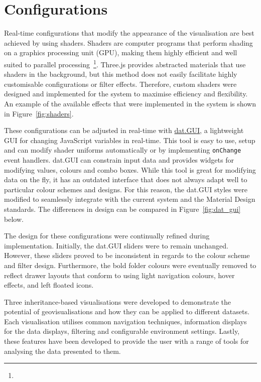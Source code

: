 \section{Configurations} {
\label{sec:configurations}

	Real-time configurations that modify the appearance of the visualisation are best achieved by using shaders. Shaders are computer programs that perform shading on a graphics processing unit (GPU), making them highly efficient and well suited to parallel processing~\footnote{}. Three.js provides abstracted materials that use shaders in the background, but this method does not easily facilitate highly customisable configurations or filter effects. Therefore, custom shaders were designed and implemented for the system to maximise efficiency and flexibility. An example of the available effects that were implemented in the system is shown in Figure~\ref{fig:shaders}.

	

	These configurations can be adjusted in real-time with \href{http://workshop.chromeexperiments.com/}{dat.GUI}, a lightweight GUI for changing JavaScript variables in real-time. This tool is easy to use, setup and can modify shader uniforms automatically or by implementing \texttt{onChange} event handlers. dat.GUI can constrain input data and provides widgets for modifying values, colours and combo boxes. While this tool is great for modifying data on the fly, it has an outdated interface that does not always adapt well to particular colour schemes and designs. For this reason, the dat.GUI styles were modified to seamlessly integrate with the current system and the Material Design standards. The differences in design can be compared in Figure~\ref{fig:dat_gui} below.

	

	The design for these configurations were continually refined during implementation. Initially, the dat.GUI sliders were to remain unchanged. However, these sliders proved to be inconsistent in regards to the colour scheme and filter design. Furthermore, the bold folder colours were eventually removed to reflect drawer layouts that conform to using light navigation colours, hover effects, and left floated icons.

}

Three inheritance-based visualisations were developed to demonstrate the potential of geovisualisations and how they can be applied to different datasets. Each visualisation utilises common navigation techniques, information displays for the data displays, filtering and configurable environment settings. Lastly, these features have been developed to provide the user with a range of tools for analysing the data presented to them.
